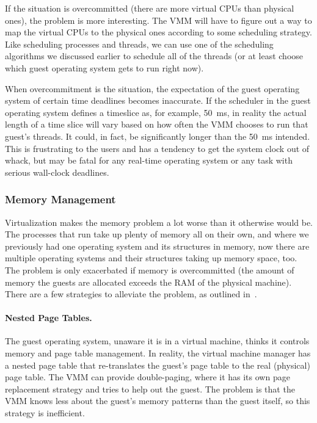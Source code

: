 If the situation is overcommitted (there are more virtual CPUs than physical ones), the problem is more interesting. The VMM will have to figure out a way to map the virtual CPUs to the physical ones according to some scheduling strategy. Like scheduling processes and threads, we can use one of the scheduling algorithms we discussed earlier to schedule all of the threads (or at least choose which guest operating system gets to run right now).

When overcommitment is the situation, the expectation of the guest operating system of certain time deadlines becomes inaccurate. If the scheduler in the guest operating system defines a timeslice as, for example, 50~ms, in reality the actual length of a time slice will vary based on how often the VMM chooses to run that guest's threads. It could, in fact, be significantly longer than the 50~ms intended. This is frustrating to the users and has a tendency to get the system clock out of whack, but may be fatal for any real-time operating system or any task with serious wall-clock deadlines.

\subsubsection*{Memory Management}

Virtualization makes the memory problem a lot worse than it otherwise would be. The processes that run take up plenty of memory all on their own, and where we previously had one operating system and its structures in memory, now there are multiple operating systems and their structures taking up memory space, too. The problem is only exacerbated if memory is overcommitted (the amount of memory the guests are allocated exceeds the RAM of the physical machine). There are a few strategies to alleviate the problem, as outlined in~\cite{osc}.

\paragraph{Nested Page Tables.} The guest operating system, unaware it is in a virtual machine, thinks it controls memory and page table management. In reality, the virtual machine manager has a nested page table that re-translates the guest's page  table to the real (physical) page table. The VMM can provide double-paging, where it has its own page replacement strategy and tries to help out the guest. The problem is that the VMM knows less about the guest's memory patterns than the guest itself, so this strategy is inefficient.

